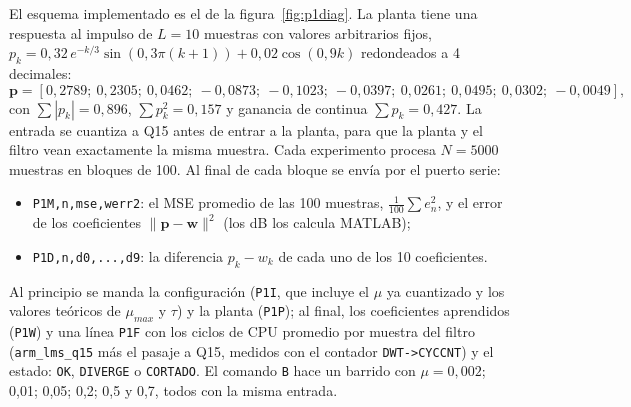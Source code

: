 \documentclass[11pt,a4paper]{article}
\newcommand{\lmsq}{\texttt{arm\_lms\_q15}}
\begin{document}
El esquema implementado es el de la figura~\ref{fig:p1diag}. La planta tiene una respuesta al impulso de $L = 10$ muestras con valores arbitrarios fijos,
$p_k = 0{,}32\,e^{-k/3}\sin(0{,}3\pi(k+1)) + 0{,}02\cos(0{,}9k)$ redondeados a 4 decimales:
\[\mathbf{p} = [0{,}2789;\ 0{,}2305;\ 0{,}0462;\ -0{,}0873;\ -0{,}1023;\ -0{,}0397;\ 0{,}0261;\ 0{,}0495;\ 0{,}0302;\ -0{,}0049],\]
con $\sum|p_k| = 0{,}896$, $\sum p_k^2 = 0{,}157$ y ganancia de continua $\sum p_k = 0{,}427$.
La entrada se cuantiza a Q15 antes de entrar a la planta, para que la planta y el filtro vean
exactamente la misma muestra. Cada experimento procesa $N = 5000$ muestras en bloques de 100. Al
final de cada bloque se envía por el puerto serie:
\begin{itemize}
  \item \texttt{P1M,n,mse,werr2}: el MSE promedio de las 100 muestras,
  $\frac{1}{100}\sum e_n^2$, y el error de los coeficientes $\|\mathbf{p}-\mathbf{w}\|^2$
  (los dB los calcula MATLAB);
  \item \texttt{P1D,n,d0,...,d9}: la diferencia $p_k - w_k$ de cada uno de los 10 coeficientes.
\end{itemize}
Al principio se manda la configuración (\texttt{P1I}, que incluye el $\mu$ ya cuantizado y los
valores teóricos de $\mu_{max}$ y $\tau$) y la planta (\texttt{P1P}); al final, los coeficientes
aprendidos (\texttt{P1W}) y una línea \texttt{P1F} con los ciclos de CPU promedio por muestra
del filtro (\lmsq{} más el pasaje a Q15, medidos con el contador \texttt{DWT->CYCCNT}) y el
estado: \texttt{OK}, \texttt{DIVERGE} o \texttt{CORTADO}. El comando \texttt{B} hace un barrido con
$\mu = 0{,}002$; 0,01; 0,05; 0,2; 0,5 y 0,7, todos con la misma entrada.
\end{document}
